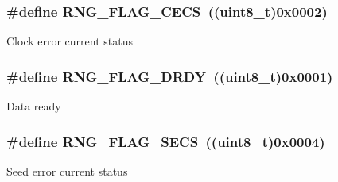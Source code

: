 \subsubsection[{R\+N\+G\+\_\+\+F\+L\+A\+G\+\_\+\+C\+E\+C\+S}]{\setlength{\rightskip}{0pt plus 5cm}\#define R\+N\+G\+\_\+\+F\+L\+A\+G\+\_\+\+C\+E\+C\+S~((uint8\+\_\+t)0x0002)}\label{group___r_n_g__flags__definition_ga4d4d7142b6c50bf0f421a1b668b3ff42}
Clock error current status \hypertarget{group___r_n_g__flags__definition_ga25845be03c05930bde3c03975eb6c44f}{}
\subsubsection[{R\+N\+G\+\_\+\+F\+L\+A\+G\+\_\+\+D\+R\+D\+Y}]{\setlength{\rightskip}{0pt plus 5cm}\#define R\+N\+G\+\_\+\+F\+L\+A\+G\+\_\+\+D\+R\+D\+Y~((uint8\+\_\+t)0x0001)}\label{group___r_n_g__flags__definition_ga25845be03c05930bde3c03975eb6c44f}
Data ready \hypertarget{group___r_n_g__flags__definition_ga0a3a6b3d5e584f04546cbcfe0b4fdac3}{}
\subsubsection[{R\+N\+G\+\_\+\+F\+L\+A\+G\+\_\+\+S\+E\+C\+S}]{\setlength{\rightskip}{0pt plus 5cm}\#define R\+N\+G\+\_\+\+F\+L\+A\+G\+\_\+\+S\+E\+C\+S~((uint8\+\_\+t)0x0004)}\label{group___r_n_g__flags__definition_ga0a3a6b3d5e584f04546cbcfe0b4fdac3}
Seed error current status 